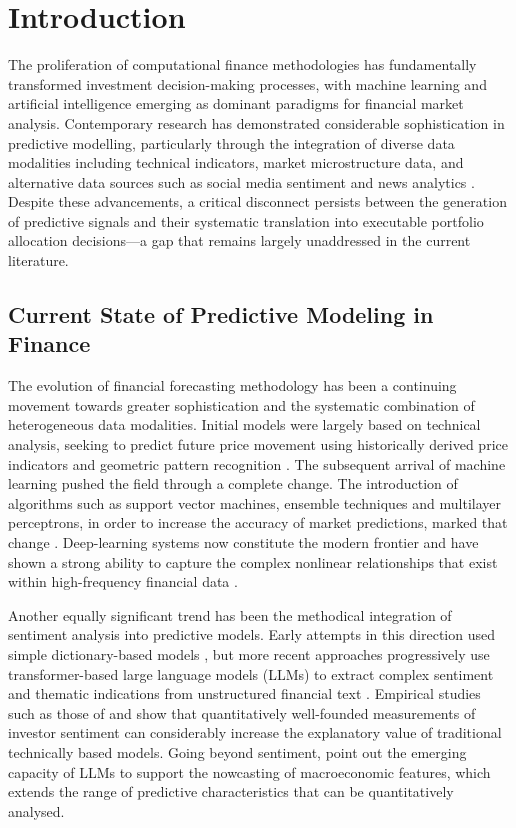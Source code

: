 \section{Introduction}
\label{sec:intro}

The proliferation of computational finance methodologies has fundamentally transformed
investment decision-making processes, with machine learning and artificial intelligence
emerging as dominant paradigms for financial market analysis. Contemporary research has
demonstrated considerable sophistication in predictive modelling, particularly through
the integration of diverse data modalities including technical indicators, market
microstructure data, and alternative data sources such as social media sentiment and
news analytics \citep{li20,zhang22}. Despite these advancements, a critical disconnect
persists between the generation of predictive signals and their systematic translation
into executable portfolio allocation decisions---a gap that remains largely unaddressed
in the current literature.

\subsection{Current State of Predictive Modeling in Finance}

The evolution of financial forecasting methodology has been a continuing movement
towards greater sophistication and the systematic combination of heterogeneous data
modalities. Initial models were largely based on technical analysis, seeking to predict
future price movement using historically derived price indicators and geometric pattern
recognition \citep{lee07}. The subsequent arrival of machine learning pushed the field
through a complete change. The introduction of algorithms such as support vector
machines, ensemble techniques and multilayer perceptrons, in order to increase the
accuracy of market predictions, marked that change \citep{chou18,liu19}. Deep-learning
systems now constitute the modern frontier and have shown a strong ability to capture
the complex nonlinear relationships that exist within high-frequency financial data
\citep{nayak22}.

Another equally significant trend has been the methodical integration of sentiment
analysis into predictive models. Early attempts in this direction used simple
dictionary-based models \citep{loughran11}, but more recent approaches progressively use
transformer-based large language models (LLMs) to extract complex sentiment and thematic
indications from unstructured financial text \citep{jung24,liu24}. Empirical studies such
as those of \citet{mu23} and \citet{bacco24} show that quantitatively well-founded
measurements of investor sentiment can considerably increase the explanatory value of
traditional technically based models. Going beyond sentiment, \citet{onozo24} point out
the emerging capacity of LLMs to support the nowcasting of macroeconomic features, which
extends the range of predictive characteristics that can be quantitatively analysed.

